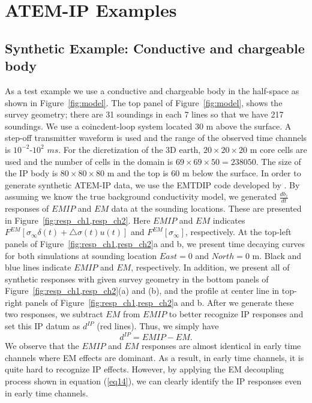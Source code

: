 \documentclass{segabs}
\begin{document}
\section{ATEM-IP Examples}
\subsection{Synthetic Example: Conductive and chargeable body}
As a test example we use a conductive and chargeable body in the half-space as shown in Figure~\ref{fig:model}. The top panel of Figure~\ref{fig:model}, shows the survey geometry; there are 31 soundings in each 7 lines so that we have 217 soundings. We use a coincdent-loop system located 30 m above the surface. A step-off transmitter waveform is used and the range of the observed time channels is $10^{-2}$-$10^2$ $ms$. For the dicretization of the 3D earth, $20\times20\times20$ m core cells are used and the number of cells in the domain is $69\times69\times50 = 238050$. The size of the IP body is $80\times80\times80$ m and the top is $60$ m below the surface. In order to generate synthetic ATEM-IP data, we use the EMTDIP code developed by \cite[]{Marchant2012a}. By assuming we know the  true background conductivity model, we generated $\frac{db_z}{dt}$ responses of $EMIP$ and $EM$ data at the sounding locations. These are presented in Figure~\ref{fig:resp_ch1,resp_ch2}. Here $EMIP$ and $EM$ indicates $F^{EM}[\sigma_{\infty}\delta(t)+\triangle\sigma(t)u(t)]$ and $F^{EM}[\sigma_{\infty}]$, respectively. At the top-left panels of Figure~\ref{fig:resp_ch1,resp_ch2}a and b, we present time decaying curves for both simulations at sounding location $East=0$ and $North=0$ m. Black and blue lines indicate $EMIP$ and $EM$, respectively. In addition, we present all of synthetic responses with given survey geometry in the bottom panels of Figure~\ref{fig:resp_ch1,resp_ch2}(a) and (b), and the profile at center line in top-right panels of Figure~\ref{fig:resp_ch1,resp_ch2}a and b. After we generate these two responses, we subtract $EM$ from $EMIP$ to better recognize IP responses and set this IP datum as $d^{IP}$ (red lines). Thus, we simply have
\begin{equation}
  d^{IP} = EMIP - EM.
  \label{eq14}
\end{equation}
We observe that the $EMIP$ and $EM$ responses are almost identical in early time channels where EM effects are dominant.  As a result, in early time channels, it is quite hard to recognize IP effects. However, by applying the EM decoupling process shown in equation (\ref{eq14}), we can clearly identify the IP responses even in early time channels.
\end{document}
